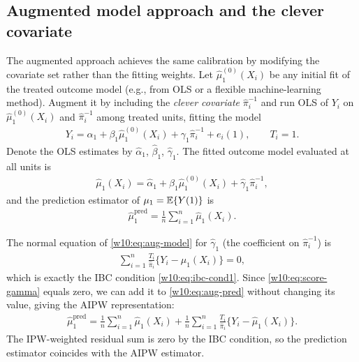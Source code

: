 \documentclass[master.tex]{subfiles}
\begin{document}
\subsection{Augmented model approach and the clever covariate}
\label{w10:subsec:augmented}

The augmented approach achieves the same calibration by modifying
the covariate set rather than the fitting weights.  Let
$\hat\mu_1^{(0)}(X_i)$ be any initial fit of the treated outcome
model (e.g., from OLS or a flexible machine-learning method).
Augment it by including the \emph{clever covariate}
$\hat\pi_i^{-1}$ \citep{vanderLaan2006targeted,vanderLaan2011targeted}
and run OLS of $Y_i$ on $\hat\mu_1^{(0)}(X_i)$ and $\hat\pi_i^{-1}$
among treated units, fitting the model
\begin{align}
  Y_i = \alpha_1 + \beta_1\hat\mu_1^{(0)}(X_i)
        + \gamma_1\hat\pi_i^{-1} + e_i(1),
  \qquad T_i = 1.
  \label{w10:eq:aug-model}
\end{align}
Denote the OLS estimates by $\hat\alpha_1$, $\hat\beta_1$,
$\hat\gamma_1$.  The fitted outcome model evaluated at all units is
\begin{align}
  \hat\mu_1(X_i)
  = \hat\alpha_1 + \hat\beta_1\hat\mu_1^{(0)}(X_i)
    + \hat\gamma_1\hat\pi_i^{-1},
  \label{w10:eq:aug-fit}
\end{align}
and the prediction estimator of $\mu_1 = \mathbb{E}\{Y(1)\}$ is
\begin{align}
  \hat\mu_1^{\mathrm{pred}}
  = \frac{1}{n}\sum_{i=1}^n \hat\mu_1(X_i).
  \label{w10:eq:aug-pred}
\end{align}

The normal equation of \eqref{w10:eq:aug-model} for $\hat\gamma_1$
(the coefficient on $\hat\pi_i^{-1}$) is
\begin{align}
  \sum_{i=1}^n \frac{T_i}{\hat\pi_i}
    \bigl\{Y_i - \hat\mu_1(X_i)\bigr\} = 0,
  \label{w10:eq:score-gamma}
\end{align}
which is exactly the IBC condition \eqref{w10:eq:ibc-cond1}.
Since \eqref{w10:eq:score-gamma} equals zero, we can add it to
\eqref{w10:eq:aug-pred} without changing its value, giving the AIPW
representation:
\begin{align}
  \hat\mu_1^{\mathrm{pred}}
  = \frac{1}{n}\sum_{i=1}^n \hat\mu_1(X_i)
    + \frac{1}{n}\sum_{i=1}^n
      \frac{T_i}{\hat\pi_i}
      \bigl\{Y_i - \hat\mu_1(X_i)\bigr\}.
  \label{w10:eq:aug-aipw}
\end{align}
The IPW-weighted residual sum is zero by the IBC condition, so the
prediction estimator coincides with the AIPW estimator.
\end{document}
